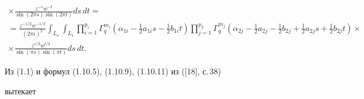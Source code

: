 \begin{multline*}
\times \frac{z^{-s}w^{-t}}{\sin(2\pi s)\sin(2\pi t)}ds\,dt=\\ 


% 


=\frac{z^{-1/2}w^{-1/2}}{(2\pi i)^2}\int_{L_s}\int_{L_t} 


\prod^{p_1}_{i=1}\Gamma^{m_i}_q(\alpha_{1i}- 


\tfrac{1}{2}a_{1i}s-\tfrac{1}{2}b_{1i}t)\prod^{p_2}_{j=1} 


\Gamma^{m_j}_q(\alpha_{2j}-\tfrac{1}{2}a_{2j} 


-\tfrac{1}{2}b_{2j}+\tfrac{1}{2}a_{2j}s+\tfrac{1}{2}b_{2j}t) \times\\


\times\frac{z^{s/2}w^{t/2}}{\sin(\pi s)\sin(\pi t)}ds\,dt. 


\end{multline*} 


 


Из (1.1) и формул (1.10.5), (1.10.9), (1.10.11) из ([18], с.\,38) 


вытекает 


 


